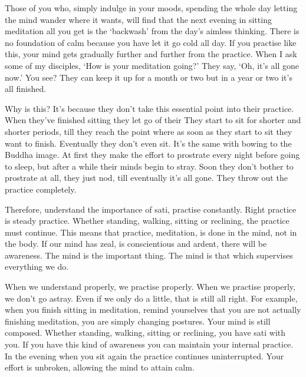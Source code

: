 Those of you who, simply indulge in your moods, spending the whole day letting the mind wander where it wants, will find that the next evening in sitting meditation all you get is the `backwash' from the day's aimless thinking. There is no foundation of calm because you have let it go cold all day. If you practise like this, your mind gets gradually further and further from the practice. When I ask some of my disciples, `How is your meditation going?' They say, `Oh, it's all gone now.' You see? They can keep it up for a month or two but in a year or two it's all finished. 

Why is this? It's because they don't take this essential point into their practice. When they've finished sitting they let go of their  They start to sit for shorter and shorter periods, till they reach the point where as soon as they start to sit they want to finish. Eventually they don't even sit. It's the same with bowing to the Buddha image. At first they make the effort to prostrate every night before going to sleep, but after a while their minds begin to stray. Soon they don't bother to prostrate at all, they just nod, till eventually it's all gone. They throw out the practice completely. 

Therefore, understand the importance of sati, practise constantly. Right practice is steady practice. Whether standing, walking, sitting or reclining, the practice must continue. This means that practice, meditation, is done in the mind, not in the body. If our mind has zeal, is conscientious and ardent, there will be awareness. The mind is the important thing. The mind is that which supervises everything we do. 

When we understand properly, we practise properly. When we practise properly, we don't go astray. Even if we only do a little, that is still all right. For example, when you finish sitting in meditation, remind yourselves that you are not actually finishing meditation, you are simply changing postures. Your mind is still composed. Whether standing, walking, sitting or reclining, you have sati with you. If you have this kind of awareness you can maintain your internal practice. In the evening when you sit again the practice continues uninterrupted. Your effort is unbroken, allowing the mind to attain calm. 

